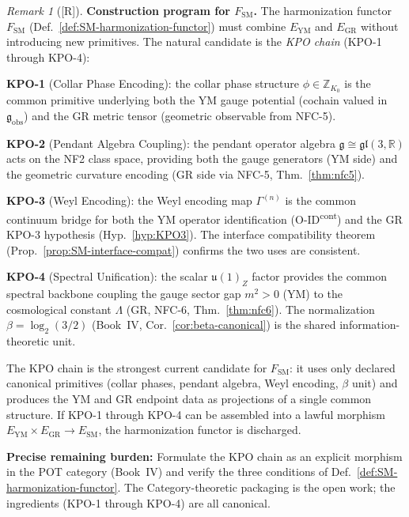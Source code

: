 \documentclass[12pt,oneside]{amsbook}
\theoremstyle{plain}
\theoremstyle{definition}
\theoremstyle{remark}
\newtheorem{remark}[theorem]{Remark}
\newcommand{\status}[1]{\textup{[#1]}}
\begin{document}
\begin{remark}[\status{R}]\label{rem:SM-harmonization-program}
\textbf{Construction program for $F_{\mathrm{SM}}$.}
The harmonization functor $F_{\mathrm{SM}}$ (Def.~\ref{def:SM-harmonization-functor})
must combine $E_{\mathrm{YM}}$ and $E_{\mathrm{GR}}$ without
introducing new primitives. The natural candidate is the
\emph{KPO chain} (KPO-1 through KPO-4):

\medskip
\noindent\textbf{KPO-1} (Collar Phase Encoding): the collar
phase structure $\phi \in \mathbb{Z}_{K_0}$ is the common
primitive underlying both the YM gauge potential (cochain
valued in $\mathfrak{g}_{\mathrm{obs}}$) and the GR metric
tensor (geometric observable from NFC-5).

\medskip
\noindent\textbf{KPO-2} (Pendant Algebra Coupling): the pendant
operator algebra $\mathfrak{g} \cong \mathfrak{gl}(3,\mathbb{R})$
acts on the NF2 class space, providing both the gauge generators
(YM side) and the geometric curvature encoding (GR side via
NFC-5, Thm.~\ref{thm:nfc5}).

\medskip
\noindent\textbf{KPO-3} (Weyl Encoding): the Weyl encoding map
$\Gamma^{(n)}$ is the common continuum bridge for both the YM
operator identification (O-ID\textsuperscript{cont}) and the GR
KPO-3 hypothesis (Hyp.~\ref{hyp:KPO3}). The interface
compatibility theorem (Prop.~\ref{prop:SM-interface-compat})
confirms the two uses are consistent.

\medskip
\noindent\textbf{KPO-4} (Spectral Unification): the scalar
$\mathfrak{u}(1)_Z$ factor provides the common spectral
backbone coupling the gauge sector gap $m^2 > 0$ (YM) to the
cosmological constant $\Lambda$ (GR, NFC-6, Thm.~\ref{thm:nfc6}).
The normalization $\beta = \log_2(3/2)$ (Book~IV,
Cor.~\ref{cor:beta-canonical}) is the shared information-theoretic
unit.

\medskip
The KPO chain is the strongest current candidate for
$F_{\mathrm{SM}}$: it uses only declared canonical primitives
(collar phases, pendant algebra, Weyl encoding, $\beta$ unit)
and produces the YM and GR endpoint data as projections of a
single common structure. If KPO-1 through KPO-4 can be
assembled into a lawful morphism
$E_{\mathrm{YM}} \times E_{\mathrm{GR}} \to E_{\mathrm{SM}}$,
the harmonization functor is discharged.

\medskip
\noindent\textbf{Precise remaining burden:} Formulate the
KPO chain as an explicit morphism in the POT category (Book~IV)
and verify the three conditions of
Def.~\ref{def:SM-harmonization-functor}. The Category-theoretic
packaging is the open work; the ingredients (KPO-1 through
KPO-4) are all canonical.
\end{remark}
\end{document}
